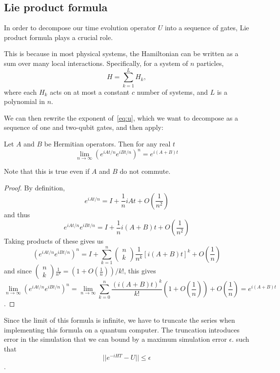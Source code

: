 \subsection{Lie product formula}
In order to decompose our time evolution operator $U$ into a sequence of gates, Lie product formula plays a crucial role.

This is because in most physical systems, the Hamiltonian
can be written as a sum over many local interactions. Specifically, for a system of $n$
particles,
\begin{equation}
H=\sum_{k=1}^{L} H_{k},
\end{equation}
where each $H_{k}$ acts on at most a constant $c$ number of systems, and $L$ is a polynomial in $n$.~\cite{Shankar}

We can then rewrite the exponent of~\ref{eq:u}, which we want to decompose as a sequence of one and two-qubit gates, and then apply:

\begin{theorem}Let $A$ and $B$ be Hermitian operators. Then for any real $t$
\begin{equation}
\lim _{n \rightarrow \infty}\left(e^{i A t / n} e^{i B t / n}\right)^{n}=e^{i(A+B) t}
\end{equation}\cite{NielsenChuang}
\end{theorem}
Note that this is true even if $A$ and $B$ do not commute.
\begin{proof}
By definition,
$$
e^{i A t / n}=I+\frac{1}{n} i A t+O\left(\frac{1}{n^{2}}\right)
$$
and thus
$$
e^{i A t / n} e^{i B t / n}=I+\frac{1}{n} i(A+B) t+O\left(\frac{1}{n^{2}}\right)
$$
Taking products of these gives us
$$
\left(e^{i A t / n} e^{i B t / n}\right)^{n}=I+\sum_{k=1}^{n}\left(\begin{array}{c}
n \\
k
\end{array}\right) \frac{1}{n^{k}}[i(A+B) t]^{k}+O\left(\frac{1}{n}\right)
$$
and since $\left(\begin{array}{c}n \\ k\end{array}\right) \frac{1}{n^{k}}=\left(1+O\left(\frac{1}{n}\right)\right) / k !$, this gives
$$
\lim _{n \rightarrow \infty}\left(e^{i A t / n} e^{i B t / n}\right)^{n}=\lim _{n \rightarrow \infty} \sum_{k=0}^{n} \frac{(i(A+B) t)^{k}}{k !}\left(1+O\left(\frac{1}{n}\right)\right)+O\left(\frac{1}{n}\right)=e^{i(A+B) t}
$$.
\end{proof}


Since the limit of this formula is infinite, we have to truncate the series when implementing this formula on a quantum computer. The truncation introduces error in the simulation that we can bound by a maximum simulation error $\epsilon$.
such that 
\begin{equation*}
|| e^{-iHT} - U || \leq \epsilon
\end{equation*}.

